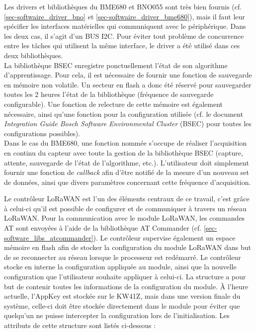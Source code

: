 
Les drivers et bibliothèques du BME680 et BNO055 sont très bien fournis (cf. \cref{sec-softwaire_driver_bno} et \cref{sec-softwaire_driver_bme680}), mais il faut leur spécifier les interfaces matérielles qui communiquent avec le périphérique. Dans les deux cas, il s'agit d'un BUS I2C. Pour éviter tout problème de concurrence entre les tâches qui utilisent la même interface, le driver  a été utilisé dans ces deux bibliothèques. \\


La bibliothèque BSEC enregistre ponctuellement l'état de son algorithme d'apprentissage. Pour cela, il est nécessaire de fournir une fonction de sauvegarde en mémoire non volatile. Un secteur en flash a donc été réservé pour sauvegarder toutes les 2 heures l'état de la bibliothèque (fréquence de sauvegarde configurable). Une fonction de relecture de cette mémoire est également nécessaire, ainsi qu'une fonction pour la configuration utilisée (cf. le document \textit{Integration Guide
Bosch Software Environmental Cluster} (BSEC) \cite{BSEClib:online} pour toutes les configurations possibles). \\

Dans le cas du BME680, une fonction nommée  s'occupe de réaliser l'acquisition en continu du capteur avec toute la gestion de la bibliothèque BSEC (capture, attente, sauvegarde de l'état de l'algorithme, etc.). L'utilisateur doit simplement fournir une fonction de \textit{callback} afin d'être notifié de la mesure d'un nouveau set de données, ainsi que divers paramètres concernant cette fréquence d'acquisition.

\label{sec-softawre_kw41z_libs_lorawan_controller}

Le contrôleur LoRaWAN est l'un des éléments centraux de ce travail, c'est grâce à celui-ci qu'il est possible de configurer et de communiquer à travers un réseau LoRaWAN. Pour la communication avec le module LoRaWAN, les commandes AT sont envoyées à l'aide de la bibliothèque AT Commander (cf. \cref{sec-software_libs_atcommander}). Le contrôleur supervise également un espace mémoire en flash afin de stocker la configuration du module LoRaWAN dans but de se reconnecter au réseau lorsque le processeur est redémarré. Le contrôleur stocke en interne la configuration appliquée au module, ainsi que la nouvelle configuration que l'utilisateur souhaite appliquer à celui-ci. La structure  a pour but de contenir toutes les informations de la configuration du module. À l'heure actuelle, l'AppKey est stockée sur le KW41Z, mais dans une version finale du système, celle-ci doit être stockée directement dans le module pour éviter que quelqu'un ne puisse intercepter la configuration lors de l'initialisation. Les attributs de cette structure sont listés ci-dessous :



